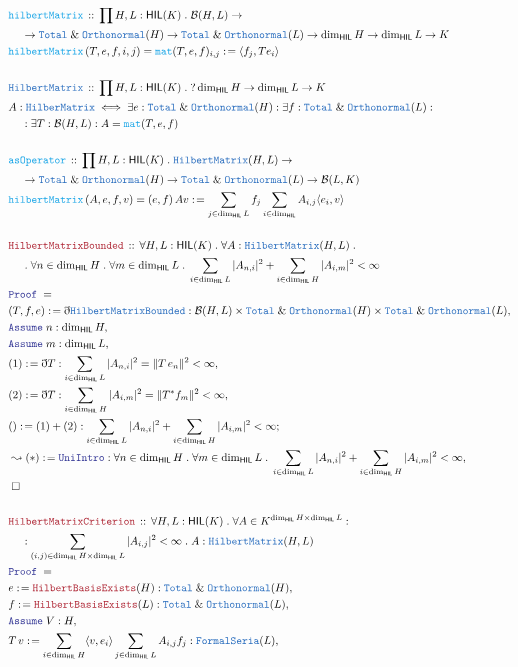 \documentclass[12pt]{scrartcl}
\newcommand{\TYPE}[1]{\textcolor{NavyBlue}{\mathtt{#1}}}
\newcommand{\FUNC}[1]{\textcolor{Cerulean}{\mathtt{#1}}}
\newcommand{\LOGIC}[1]{\textcolor{Blue}{\mathtt{#1}}}
\newcommand{\THM}[1]{\textcolor{Maroon}{\mathtt{#1}}}
\renewcommand{\.}{\; . \;}
\newcommand{\de}{: \kern 0.1pc =}
\newcommand{\Act}[1]{\left( #1 \right)}
\newcommand{\Theorem}[2]{& \THM{#1} \, :: \, #2 \\ & \Proof = \\ }
\newcommand{\DeclareType}[2]{& \TYPE{#1} \, :: \, #2 \\}
\newcommand{\DefineType}[3]{& #1 : \TYPE{#2} \iff #3 \\}
\newcommand{\DeclareFunc}[2]{& \FUNC{#1} \, :: \, #2 \\}
\newcommand{\DefineNamedFunc}[4]{&  \FUNC{#1}\Act{#2} = #3 \de #4 \\}
\newcommand{\NewLine}{\\ & \kern 1pc}
\newcommand{\Page}[1]{\begin{align*} #1 \end{align*} \newpage   }
\newcommand{ \bd }{ \ByDef }
\renewcommand{\And}{\; \& \;}
\newcommand{\Say}[3]{& #1 \de #2 : #3, \\}
\newcommand{\Conclude}[3]{& #1 \de #2 : #3; \\}
\newcommand{\Derive}[3]{& \leadsto #1 \de #2 : #3, \\}
\newcommand{\A}{\LOGIC{Assume} \;}
\newcommand{\Assume}[2]{& \A #1 : #2, \\}
\newcommand{\QED}{\; \square}
\newcommand{\EndProof}{& \QED \\}
\newcommand{\ByDef}{\eth}
\newcommand{\Proof}{\LOGIC{Proof} \; }
\newcommand{\HIL}{\textsf{HIL}}
\newcommand{\B}{\mathcal{B}}
\begin{document}
\Page{
\DeclareFunc{hilbertMatrix}{\prod H, L : \HIL(K) \.
 \B(H,L) \to \NewLine \to
 \TYPE{Total} \And 
 \TYPE{Orthonormal}(H) \to
  \TYPE{Total} \And 
 \TYPE{Orthonormal}(L) \to
 \dim_{\HIL} H \to \dim_{\HIL} L  \to K 
 }
\DefineNamedFunc{hilbertMatrix}{T,e,f,i,j}{ \FUNC{mat}(T,e,f)_{i,j} }{ \langle  f_j , Te_i \rangle}
\\
\DeclareType{HilbertMatrix}{\prod H, L : \HIL(K) \. ?  \dim_{\HIL} H \to \dim_{\HIL} L  \to K }
\DefineType{A}{HilberMatrix}{\exists e : \TYPE{Total} \And  \TYPE{Orthonormal}(H) : \exists f :
  \TYPE{Total} \And 
 \TYPE{Orthonormal}(L) : \NewLine 
 : \exists T : \B(H,L)
 : A = \FUNC{mat}(T,e,f)}
\\
\DeclareFunc{asOperator}{\prod H, L : \HIL(K) \.
 \TYPE{HilbertMatrix}(H,L) \to \NewLine \to
 \TYPE{Total} \And 
 \TYPE{Orthonormal}(H) \to
  \TYPE{Total} \And 
 \TYPE{Orthonormal}(L) \to
 \B(L,K)
 }
\DefineNamedFunc{hilbertMatrix}{A,e,f, v }{ (e,f) \, A v }{ 
 \sum_{j \in \dim_{\HIL} L} f_j \sum_{i \in \dim_{\HIL} } A_{i,j} \langle e_i, v \rangle}
\\
\Theorem{HilbertMatrixBounded}{\forall H, L : \HIL(K) \. \forall A : \TYPE{HilbertMatrix}(H,L)
\.  \NewLine
 \. \forall n \in \dim_{\HIL} H  \. \forall m \in \dim_{\HIL} L \.  \sum_{i \in \dim_{\HIL} L} | A_{n,i} |^2  + \sum_{i \in \dim_{\HIL} H} | A_{i,m}|^2  < \infty }
\Say{(T,f,e)}{\bd \TYPE{HilbertMatrixBounded}}{\B(H,L) \times 
\TYPE{Total} \And  \TYPE{Orthonormal}(H) \times
\TYPE{Total} \And  \TYPE{Orthonormal}(L)}
\Assume{n}{\dim_{\HIL} H}
\Assume{m}{\dim_{\HIL} L}
\Say{(1)}{\bd T}
{ \sum_{i \in \dim_{\HIL} L} | A_{n,i} |^2 = \| T \, e_n \|^2 < \infty }
\Say{(2)}{\bd T}
{ \sum_{i \in \dim_{\HIL} H} | A_{i,m} |^2 = \| T^* f_m   \|^2 < \infty
}
\Conclude{()}{(1) + (2)}{ \sum_{i \in \dim_{\HIL} L} | A_{n,i} |^2  + \sum_{i \in \dim_{\HIL} H} | A_{i,m}|^2  < \infty  }
\Derive{(*)}{\LOGIC{UniIntro}}{
 \forall n \in \dim_{\HIL} H  \. \forall m \in \dim_{\HIL} L \.  \sum_{i \in \dim_{\HIL} L} | A_{n,i} |^2  + \sum_{i \in \dim_{\HIL} H} | A_{i,m}|^2  < \infty 
}
\EndProof
\\ 
\Theorem{HilbertMatrixCriterion}{\forall H, L : \HIL(K) \. \forall A \in K^{\dim_{\HIL} H \times \dim_{\HIL} L} 
: \NewLine
: \sum_{(i,j) \in  \dim_{\HIL} H \times \dim_{\HIL} L} |A_{i,j} |^2 < \infty \.
A : \TYPE{HilbertMatrix}(H,L)
}
\Say{e}{\THM{HilbertBasisExists}(H)}{ \TYPE{Total} \And  \TYPE{Orthonormal}(H) }
\Say{f}{\THM{HilbertBasisExists}(L)}{ \TYPE{Total} \And  \TYPE{Orthonormal}(L) }
\Assume{V}{H}
\Say{T\,v}{\sum_{i \in \dim_{\HIL} H} \langle v, e_i  \rangle \sum_{j \in \dim_{\HIL} L} A_{i,j}f_j }
{\TYPE{FormalSeria}(L)}
}
\end{document}
